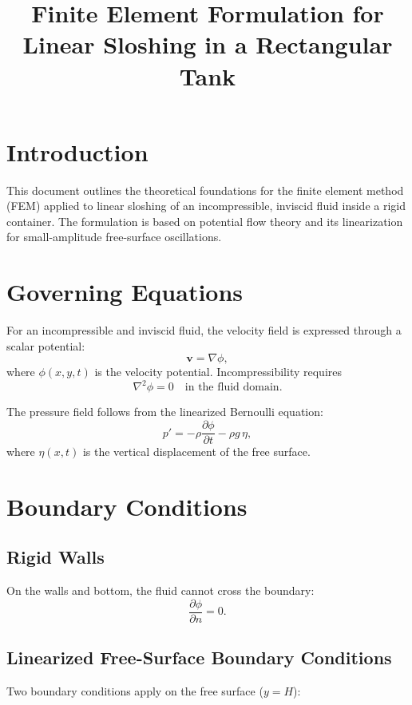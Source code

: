 \documentclass{article}
\title{Finite Element Formulation for Linear Sloshing in a Rectangular Tank}
\author{}
\date{}
\begin{document}
\maketitle

\section{Introduction}
This document outlines the theoretical foundations for the finite element method (FEM) applied to linear sloshing of an incompressible, inviscid fluid inside a rigid container. The formulation is based on potential flow theory and its linearization for small-amplitude free-surface oscillations.

\section{Governing Equations}
For an incompressible and inviscid fluid, the velocity field is expressed through a scalar potential:
\begin{equation}
    \bm{v} = \nabla \phi,
\end{equation}
where $\phi(x,y,t)$ is the velocity potential. Incompressibility requires
\begin{equation}
    \nabla^2 \phi = 0 \quad \text{in the fluid domain}.
\end{equation}

The pressure field follows from the linearized Bernoulli equation:
\begin{equation}
    p' = -\rho \frac{\partial \phi}{\partial t} - \rho g \, \eta,
\end{equation}
where $\eta(x,t)$ is the vertical displacement of the free surface.

\section{Boundary Conditions}
\subsection{Rigid Walls}
On the walls and bottom, the fluid cannot cross the boundary:
\begin{equation}
    \frac{\partial \phi}{\partial n} = 0.
\end{equation}

\subsection{Linearized Free-Surface Boundary Conditions}
Two boundary conditions apply on the free surface ($y=H$):
\end{document}
